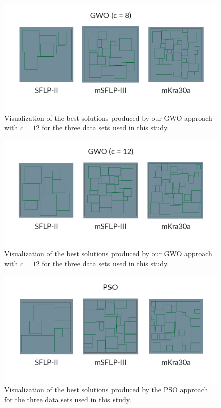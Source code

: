 \begin{figure}[h!]
\centering
\includegraphics[scale=1.85]{./images/chap07-rd/gwo-c8-best-solutions.png}
\caption{Visualization of the best solutions produced by our GWO approach with $c=12$ for the three data sets used in this study.}
\label{best-results-gwo-c8}
\end{figure}

\begin{figure}[h!]
\centering
\includegraphics[scale=1.85]{./images/chap07-rd/gwo-c12-best-solutions.png}
\caption{Visualization of the best solutions produced by our GWO approach with $c=12$ for the three data sets used in this study.}
\label{best-results-gwo}
\end{figure}

\begin{figure}[h!]
\centering
\includegraphics[scale=1.85]{./images/chap07-rd/pso-best-solutions.png}
\caption{Visualization of the best solutions produced by the PSO approach for the three data sets used in this study.}
\label{best-results-pso}
\end{figure}

